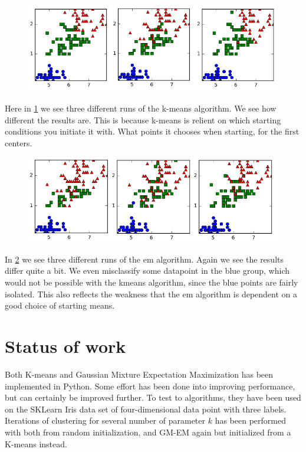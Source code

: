 \documentclass[a4paper,10pt,article,oneside,english]{memoir}
\let\oldcaption\caption
\renewcommand{\caption}[1]{\oldcaption{\emph{#1}}}
\begin{document}
\begin{figure}
	\centering
	\includegraphics[width=\textwidth]{kmeans1.png}
	\caption{}
	\label{fig:km}
\end{figure}
Here in \ref{fig:km} we see three different runs of the k-means algorithm. We see how different the results are. This is because k-means is relient on which starting conditions you initiate it with. What points it chooses when starting, for the first centers.
\begin{figure}
	\centering
	\includegraphics[width=\textwidth]{em1.png}
	\caption{}
	\label{fig:em}
\end{figure}
In \ref{fig:em} we see three different runs of the em algorithm. Again we see the results differ quite a bit. We even misclassify some datapoint in the blue group, which would not be possible with the kmeans algorithm, since the blue points are fairly isolated. This also reflects the weakness that the em algorithm is dependent on a good choice of starting means.

\section*{Status of work}
Both K-means and Gaussian Mixture Expectation Maximization has been implemented in Python. Some effort has been done into improving performance, but can certainly be improved further. To test to algorithms, they have been used on the SKLearn Iris data set of four-dimensional data point with three labels. Iterations of clustering for several number of parameter $k$ has been performed with both from random initialization, and GM-EM again but initialized from a K-means instead. 
\end{document}
